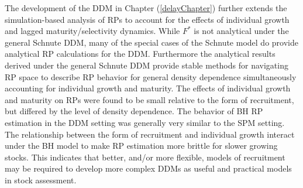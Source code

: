 \documentclass[12pt]{ucscthesis}
\begin{document}

%
The development of the DDM in Chapter (\ref{delayChapter}) further 
extends the simulation-based analysis of RPs to account for the effects of 
individual growth and lagged maturity/selectivity dynamics. While $F^*$ is not analytical 
under the general Schnute DDM, many of the special cases of the Schnute model 
do provide analytical RP calculations for the DDM.
Furthermore the analytical results derived under the general Schnute DDM 
provide stable methods for navigating RP space to describe RP behavior for 
general density dependence simultaneously accounting for individual growth 
and maturity. %
The effects of individual growth and maturity on RPs were found to be small 
relative to the form of recruitment, but differed by the level of density 
dependence. The behavior of BH RP estimation in the DDM setting was generally 
very similar to the SPM setting. The relationship between the form of recruitment 
and individual growth interact under the BH model to make RP estimation more 
brittle for slower growing stocks. This indicates that better, and/or more flexible, 
models of recruitment may be required to develop more complex DDMs as useful 
and practical models in stock assessment. 

\end{document}
